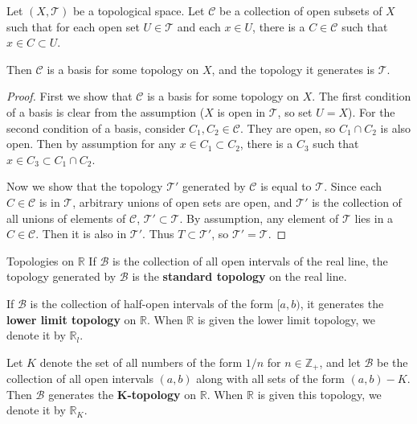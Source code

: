 \documentclass[10pt]{report}
\begin{document}
\begin{prop}
	\label{open-basis}
	Let $(X, \mathcal{T})$ be a topological space. Let $\mathcal{C}$ be a collection of open subsets of $X$ such that for each open set $U \in \mathcal{T}$ and each $x \in U$, there is a $C \in \mathcal{C}$ such that $x \in C \subset U$.

	Then $\mathcal{C}$ is a basis for some topology on $X$, and the topology it generates is $\mathcal{T}$.
\end{prop}
\begin{proof}
	First we show that $\mathcal{C}$ is a basis for some topology on $X$. The first condition of a basis is clear from the assumption ($X$ is open in $\mathcal{T}$, so set $U=X$). For the second condition of a basis, consider $C_1, C_2\in \mathcal{C}$. They are open, so $C_1 \cap C_2$ is also open. Then by assumption for any $x \in C_1 \subset C_2$, there is a $C_3$ such that $x \in C_3 \subset C_1 \cap C_2$.

	Now we show that the topology $\mathcal{T}'$ generated by $\mathcal{C}$ is equal to $\mathcal{T}$. Since each $C \in \mathcal{C}$ is in $\mathcal{T}$, arbitrary unions of open sets are open, and $\mathcal{T}'$ is the collection of all unions of elements of $\mathcal{C}$, $\mathcal{T}' \subset \mathcal{T}$. By assumption, any element of $\mathcal{T}$ lies in a $C \in \mathcal{C}$. Then it is also in $\mathcal{T}'$. Thus $T \subset \mathcal{T}'$, so $\mathcal{T}' = \mathcal{T}$.
\end{proof}

\begin{defn}{Topologies on $\mathbb{R}$}{}
If $\mathcal{B}$ is the collection of all open intervals of the real line, the topology generated by $\mathcal{B}$ is the \textbf{standard topology} on the real line.

If $\mathcal{B}$ is the collection of half-open intervals of the form $[a,b)$, it generates the \textbf{lower limit topology} on $\mathbb{R}$. When $\mathbb{R}$ is given the lower limit topology, we denote it by $\mathbb{R}_l$.

Let $K$ denote the set of all numbers of the form $1/n$ for $n \in \mathbb{Z}_+$, and let $\mathcal{B}$ be the collection of all open intervals $(a,b)$ along with all sets of the form $(a,b) - K$. Then $\mathcal{B}$ generates the \textbf{K-topology} on $\mathbb{R}$. When $\mathbb{R}$ is given this topology, we denote it by $\mathbb{R}_K$.
\end{defn}
\end{document}
